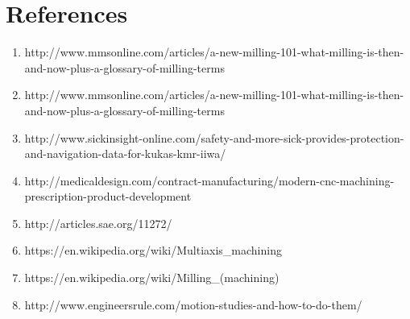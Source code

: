%
%

\chapter*{References}
\begin{enumerate}
	
	\item http://www.mmsonline.com/articles/a-new-milling-101-what-milling-is-then-and-now-plus-a-glossary-of-milling-terms 
	\item http://www.mmsonline.com/articles/a-new-milling-101-what-milling-is-then-and-now-plus-a-glossary-of-milling-terms 
	\item http://www.sickinsight-online.com/safety-and-more-sick-provides-protection-and-navigation-data-for-kukas-kmr-iiwa/ 
	\item http://medicaldesign.com/contract-manufacturing/modern-cnc-machining-prescription-product-development 
   	\item http://articles.sae.org/11272/ 
	\item https://en.wikipedia.org/wiki/Multiaxis\_machining 
	\item https://en.wikipedia.org/wiki/Milling\_(machining) 
	\item http://www.engineersrule.com/motion-studies-and-how-to-do-them/


\end{enumerate}
